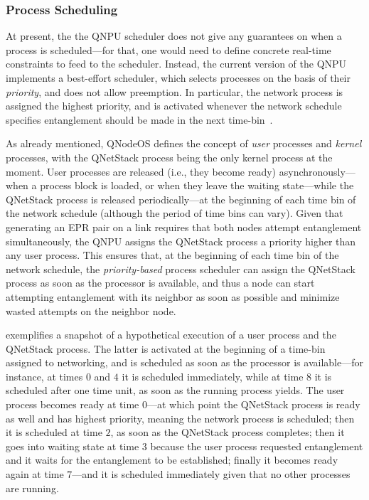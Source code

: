 \subsubsection{Process Scheduling}
\label{sec:design:scheduling}

At present, the the \ac{QNPU} scheduler does not give any guarantees on when a process is scheduled---for that, one would need to define concrete real-time constraints to feed to the scheduler. Instead, the current version of the \ac{QNPU} implements a best-effort scheduler, which selects processes on the basis of their \emph{priority}, and does not allow preemption. In particular, the network process is assigned the highest priority, and is activated whenever the network schedule specifies entanglement should be made in the next time-bin~\cite{skrzypczyk_2021_arch}. 

As already mentioned, \ac{QNodeOS} defines the concept of \emph{user} processes and \emph{kernel} processes, with the \ac{QNetStack} process being the only kernel process at the moment. User processes are released (i.e., they become ready) asynchronously---when a process block is loaded, or when they leave the waiting state---while the \ac{QNetStack} process is released periodically---at the beginning of each time bin of the network schedule (although the period of time bins can vary). Given that generating an \ac{EPR} pair on a link requires that both nodes attempt entanglement simultaneously, the \ac{QNPU} assigns the \ac{QNetStack} process a priority higher than any user process. This ensures that, at the beginning of each time bin of the network schedule, the \emph{priority-based} process scheduler can assign the \ac{QNetStack} process as soon as the processor is available, and thus a node can start attempting entanglement with its neighbor as soon as possible and minimize wasted attempts on the neighbor node.

 exemplifies a snapshot of a hypothetical execution of a user process and the \ac{QNetStack} process. The latter is activated at the beginning of a time-bin assigned to networking, and is scheduled as soon as the processor is available---for instance, at times $0$ and $4$ it is scheduled immediately, while at time $8$ it is scheduled after one time unit, as soon as the running process yields. The user process becomes ready at time $0$---at which point the \ac{QNetStack} process is ready as well and has highest priority, meaning the network process is scheduled; then it is scheduled at time $2$, as soon as the \ac{QNetStack} process completes; then it goes into waiting state at time $3$ because the user process requested entanglement and it waits for the entanglement to be established; finally it becomes ready again at time $7$---and it is scheduled immediately given that no other processes are running.

